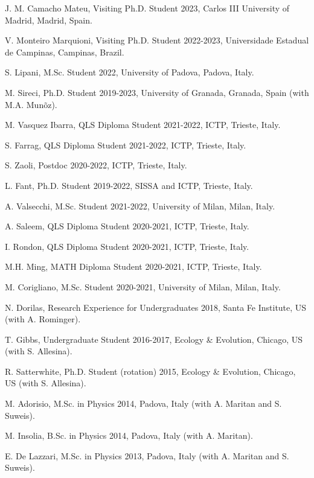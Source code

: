 \documentclass[10pt]{article}
\begin{document}
\begin{outerlist}
\item J. M. Camacho Mateu, Visiting Ph.D. Student 2023, Carlos III University of Madrid, Madrid, Spain.
\item V. Monteiro Marquioni, Visiting Ph.D. Student 2022-2023, Universidade Estadual de Campinas, Campinas, Brazil.
\item S. Lipani, M.Sc. Student 2022, University of Padova, Padova, Italy.
\item M. Sireci, Ph.D. Student 2019-2023, University of Granada, Granada, Spain (with M.A. Mun\~oz). 
\item M. Vasquez Ibarra, QLS Diploma Student 2021-2022, ICTP, Trieste, Italy.
\item S. Farrag, QLS Diploma Student 2021-2022, ICTP, Trieste, Italy.
\item S. Zaoli, Postdoc 2020-2022, ICTP, Trieste, Italy.
\item L. Fant, Ph.D. Student 2019-2022, SISSA and ICTP, Trieste, Italy.
\item A. Valsecchi, M.Sc. Student 2021-2022, University of Milan, Milan, Italy.
\item A. Saleem, QLS Diploma Student 2020-2021, ICTP, Trieste, Italy.
\item I. Rondon, QLS Diploma Student 2020-2021, ICTP, Trieste, Italy.
\item M.H. Ming, MATH Diploma Student 2020-2021, ICTP, Trieste, Italy.
\item M. Corigliano, M.Sc. Student 2020-2021, University of Milan, Milan, Italy.
\item N. Dorilas, Research Experience for Undergraduates 2018, Santa Fe Institute, US (with A. Rominger). 
\item T. Gibbs, Undergraduate Student 2016-2017, Ecology \& Evolution, Chicago, US (with S. Allesina).
\item R. Satterwhite, Ph.D. Student (rotation) 2015, Ecology \& Evolution, Chicago, US (with S. Allesina).
\item M. Adorisio, M.Sc. in Physics 2014, Padova, Italy (with A. Maritan and S. Suweis). 
\item M. Insolia, B.Sc. in Physics 2014, Padova, Italy (with A. Maritan). 
\item E. De Lazzari, M.Sc. in Physics 2013, Padova, Italy (with A. Maritan and S. Suweis). 

\end{outerlist}
\end{document}
